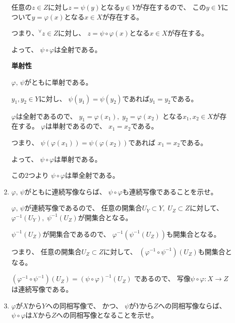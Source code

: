 \documentclass[12pt,b5paper]{ltjsarticle}
\begin{document}
\begin{enumerate}
\begin{enumerate}
            任意の$z \in Z$に対し$z=\psi(y)$となる$y\in Y$が存在するので、
            この$y\in Y$について$y=\varphi(x)$となる$x\in X$が存在する。

            つまり、${}^{\forall}z\in Z$に対し、
            $z=\psi\circ\varphi(x)$となる$x\in X$が存在する。

            よって、
            $\psi\circ\varphi$は全射である。

            \textbf{単射性}

            $\varphi,\,\psi$がともに単射である。

            $y_{1},y_{2}\in Y$に対し、
            $\psi(y_{1})=\psi(y_{2})$であれば$y_{1}=y_{2}$である。

            $\varphi$は全射であるので、
            $y_{1}=\varphi(x_{1}),\;y_{2}=\varphi(x_{2})$
            となる$x_{1},x_{2}\in X$が存在する。
            $\varphi$は単射であるので、
            $x_{1}=x_{2}$である。

            つまり、
            $\psi(\varphi(x_{1}))=\psi(\varphi(x_{2}))$であれば
            $x_{1}=x_{2}$である。

            よって、
            $\psi\circ\varphi$は単射である。

            この2つより
            $\psi\circ\varphi$は単全射である。

            \hrulefill

       \item
            $\varphi,\,\psi$がともに連続写像ならば、
            $\psi\circ\varphi$も連続写像であることを示せ。

            \dotfill

            $\varphi,\,\psi$が連続写像であるので、
            任意の開集合$U_{Y}\subset Y,\; U_{Z}\subset Z$に対して、
            $\varphi^{-1}(U_{Y}),\; \psi^{-1}(U_{Z})$が開集合となる。

            $\psi^{-1}(U_{Z})$が開集合であるので、
            $\varphi^{-1}(\psi^{-1}(U_{Z}))$も開集合となる。

            つまり、
            任意の開集合$U_{Z}\subset Z$に対して、
            $(\varphi^{-1}\circ\psi^{-1})(U_{Z})$も開集合となる。

            $(\varphi^{-1}\circ\psi^{-1})(U_{Z})=(\psi\circ\varphi)^{-1}(U_{Z})$
            であるので、
            写像$\psi\circ\varphi : X\to Z$は連続写像である。

            \hrulefill

       \item
            $\varphi$が$X$から$Y$への同相写像で、
            かつ、
            $\psi$が$Y$から$Z$への同相写像ならば、
            $\psi\circ\varphi$は$X$から$Z$への同相写像となることを示せ。


\end{enumerate}
\end{enumerate}
\end{document}
